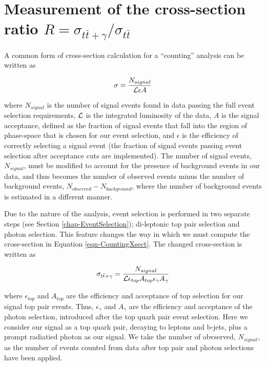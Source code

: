 \section{Measurement of the cross-section ratio $R = \sigma_{t\bar{t}+\gamma}/\sigma_{t\bar{t}}$}

A common form of cross-section calculation for a ``counting'' analysis can be written as

\begin{equation} \label{eqn-CountingXsect}
\sigma = \frac{N_{signal}}{\mathcal{L} \epsilon A}
\end{equation}

where $N_{signal}$ is the number of signal events found in data passing the full event selection requirements, $\mathcal{L}$ is the integrated luminosity of the data, $A$ is the signal acceptance, defined as the fraction of signal events that fall into the region of phase-space that is chosen for our event selection, and $\epsilon$ is the efficiency of correctly selecting a signal event (the fraction of signal events passing event selection after acceptance cuts are implemented). The number of signal events, $N_{signal}$, must be modified to account for the presence of background events in our data, and thus becomes the number of observed events minus the number of background events, $N_{observed} - N_{background}$, where the number of background events is estimated in a different manner. 

Due to the nature of the analysis, event selection is performed in two separate steps (see Section \ref{chap-EventSelection}); di-leptonic top pair selection and photon selection. This feature changes the way in which we must compute the cross-section in Equation \ref{eqn-CountingXsect}. The changed cross-section is written as

\begin{equation}
\sigma_{t\bar{t}+\gamma} = \frac{N_{signal}}{\mathcal{L} \epsilon_{top} A_{top} \epsilon_{\gamma} A_{\gamma}}
\end{equation}

where $\epsilon_{top}$ and $A_{top}$ are the efficiency and acceptance of top selection for our signal top pair events. Thus, $\epsilon_{\gamma}$ and $A_{\gamma}$ are the efficiency and acceptance of the photon selection, introduced after the top quark pair event selection. Here we consider our signal as a top quark pair, decaying to leptons and b-jets, plus a prompt radiatied photon as our signal. We take the number of obvserved, $N_{signal}$, as the number of events counted from data after top pair and photon selections have been applied.

